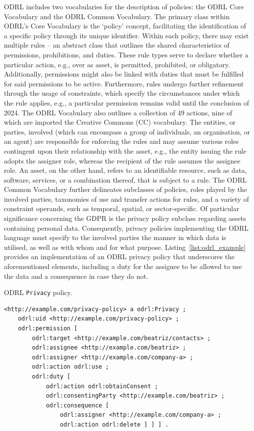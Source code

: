 ODRL includes two vocabularies for the description of policies: the ODRL Core Vocabulary and the ODRL Common Vocabulary.
The primary class within ODRL's Core Vocabulary is the `policy' concept, facilitating the identification of a specific policy through its unique identifier.
Within each policy, there may exist multiple rules -- an abstract class that outlines the shared characteristics of permissions, prohibitions, and duties.
These rule types serve to declare whether a particular action, e.g., over as asset, is permitted, prohibited, or obligatory.
Additionally, permissions might also be linked with duties that must be fulfilled for said permissions to be active.
Furthermore, rules undergo further refinement through the usage of constraints, which specify the circumstances under which the rule applies, e.g., a particular permission remains valid until the conclusion of 2024.
The ODRL Vocabulary also outlines a collection of 49 actions, nine of which are imported the Creative Commons (CC) vocabulary.
The entities, or parties, involved (which can encompass a group of individuals, an organisation, or an agent) are responsible for enforcing the rules and may assume various roles contingent upon their relationship with the asset, e.g., the entity issuing the rule adopts the assigner role, whereas the recipient of the rule assumes the assignee role.
An asset, on the other hand, refers to an identifiable resource, such as data, software, services, or a combination thereof, that is subject to a rule.
The ODRL Common Vocabulary further delineates subclasses of policies, roles played by the involved parties, taxonomies of use and transfer actions for rules, and a variety of constraint operands, such as temporal, spatial, or sector-specific.
Of particular significance concerning the GDPR is the privacy policy subclass regarding assets containing personal data. 
Consequently, privacy policies implementing the ODRL language must specify to the involved parties the manner in which data is utilised, as well as with whom and for what purpose.
Listing~\ref{list:odrl_example} provides an implementation of an ODRL privacy policy that underscores the aforementioned elements, including a duty for the assignee to be allowed to use the data and a consequence in case they do not.

\begin{listing}
\caption[ODRL privacy policy.]{ODRL \texttt{Privacy} policy.}
\label{list:odrl_example}
\begin{verbatim}
<http://example.com/privacy-policy> a odrl:Privacy ;
    odrl:uid <http://example.com/privacy-policy> ;
    odrl:permission [
        odrl:target <http://example.com/beatriz/contacts> ;
        odrl:assignee <http://example.com/beatriz> ;
        odrl:assigner <http://example.com/company-a> ;
        odrl:action odrl:use ;
        odrl:duty [
            odrl:action odrl:obtainConsent ;
            odrl:consentingParty <http://example.com/beatriz> ;
            odrl:consequence [
                odrl:assigner <http://example.com/company-a> ;
                odrl:action odrl:delete ] ] ] . 
\end{verbatim}
\end{listing}

